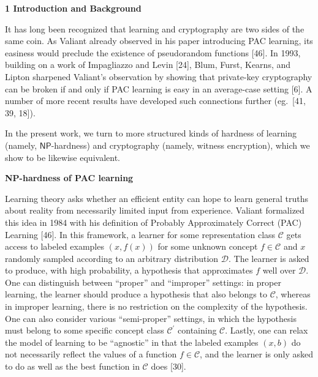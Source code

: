 

\par\medskip\noindent\textbf{
1 Introduction and Background}\par




It has long been recognized that learning and cryptography are two sides of the same coin. As Valiant already observed in his paper introducing PAC learning, its easiness would preclude the existence of pseudorandom functions [46]. In 1993, building on a work of Impagliazzo and Levin [24], Blum, Furst, Kearns, and Lipton sharpened Valiant’s observation by showing that private-key cryptography can be broken if and only if PAC learning is easy in an average-case setting [6]. A number of more recent results have developed such connections further (eg. [41, 39, 18]).\par




In the present work, we turn to more structured kinds of hardness of learning (namely, ${\mathsf{NP}}$-hardness) and cryptography (namely, witness encryption), which we show to be likewise equivalent.\par




\par\medskip\noindent\textbf{NP-hardness of PAC learning}\par




Learning theory asks whether an efficient entity can hope to learn general truths about reality from necessarily limited input from experience. Valiant formalized this idea in 1984 with his definition of Probably Approximately Correct (PAC) Learning [46]. In this framework, a learner for some representation class $\mathcal{C}$ gets access to labeled examples $(x,f(x))$ for some unknown concept $f\in\mathcal{C}$ and $x$ randomly sampled according to an arbitrary distribution $\mathcal{D}$. The learner is asked to produce, with high probability, a hypothesis that approximates $f$ well over $\mathcal{D}$. One can distinguish between “proper” and “improper” settings: in proper learning, the learner should produce a hypothesis that also belongs to $\mathcal{C}$, whereas in improper learning, there is no restriction on the complexity of the hypothesis. One can also consider various “semi-proper” settings, in which the hypothesis must belong to some specific concept class $\mathcal{C^{\prime}}$ containing $\mathcal{C}$. Lastly, one can relax the model of learning to be “agnostic” in that the labeled examples $(x,b)$ do not necessarily reflect the values of a function $f\in\mathcal{C}$, and the learner is only asked to do as well as the best function in $\mathcal{C}$ does [30].\par




